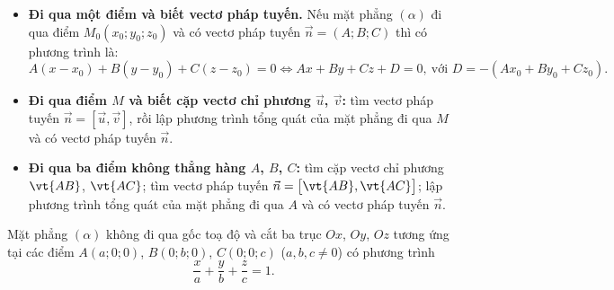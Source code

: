 \begin{congthuc}
\begin{itemize}
  \item \textbf{Đi qua một điểm và biết vectơ pháp tuyến.} Nếu mặt phẳng $(\alpha)$ đi qua điểm $M_0(x_0;y_0;z_0)$ và có vectơ pháp tuyến $\vec n=(A;B;C)$ thì có phương trình là:
  \[A(x-x_0)+B(y-y_0)+C(z-z_0)=0\Leftrightarrow Ax+By+Cz+D=0,\ \text{với } D=-(Ax_0+By_0+Cz_0).\]
  \item \textbf{Đi qua điểm $M$ và biết cặp vectơ chỉ phương $\vec u$, $\vec v$:} tìm vectơ pháp tuyến $\vec n=[\vec u,\vec v]$, rồi lập phương trình tổng quát của mặt phẳng đi qua $M$ và có vectơ pháp tuyến $\vec n$.
  \item \textbf{Đi qua ba điểm không thẳng hàng $A$, $B$, $C$:} tìm cặp vectơ chỉ phương $\vt{AB}$, $\vt{AC}$; tìm vectơ pháp tuyến $\vec n=\big[\vt{AB},\vt{AC}\big]$; lập phương trình tổng quát của mặt phẳng đi qua $A$ và có vectơ pháp tuyến $\vec n$.
\end{itemize}
\end{congthuc}

\begin{kienthuc}
\begin{minipage}[c]{.6\linewidth}
Mặt phẳng $(\alpha)$ không đi qua gốc toạ độ và cắt ba trục $Ox$, $Oy$, $Oz$ tương ứng tại các điểm $A(a;0;0)$, $B(0;b;0)$, $C(0;0;c)$ ($a,b,c\ne0$) có phương trình
\[\frac xa+\frac yb+\frac zc=1.\]
\end{minipage}\hfill
\begin{minipage}[c]{.37\linewidth}\centering
{}
\end{minipage}
\end{kienthuc}

